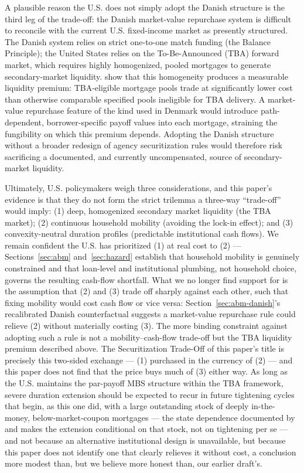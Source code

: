 \documentclass[12pt]{article}
\begin{document}
A plausible reason the U.S. does not simply adopt the Danish structure is the third leg of the trade-off: the Danish market-value repurchase system is difficult to reconcile with the current U.S. fixed-income market as presently structured. The Danish system relies on strict one-to-one match funding (the Balance Principle); the United States relies on the To-Be-Announced (TBA) forward market, which requires highly homogenized, pooled mortgages to generate secondary-market liquidity. \citet{vickery2013} show that this homogeneity produces a measurable liquidity premium: TBA-eligible mortgage pools trade at significantly lower cost than otherwise comparable specified pools ineligible for TBA delivery. A market-value repurchase feature of the kind used in Denmark would introduce path-dependent, borrower-specific payoff values into each mortgage, straining the fungibility on which this premium depends. Adopting the Danish structure without a broader redesign of agency securitization rules would therefore risk sacrificing a documented, and currently uncompensated, source of secondary-market liquidity.

Ultimately, U.S. policymakers weigh three considerations, and this paper's evidence is that they do not form the strict trilemma a three-way ``trade-off'' would imply: (1) deep, homogenized secondary market liquidity (the TBA market); (2) continuous household mobility (avoiding the lock-in effect); and (3) convexity-neutral duration profiles (predictable institutional cash flows). We remain confident the U.S. has prioritized (1) at real cost to (2) --- Sections~\ref{sec:abm} and~\ref{sec:hazard} establish that household mobility is genuinely constrained and that loan-level and institutional plumbing, not household choice, governs the resulting cash-flow shortfall. What we no longer find support for is the assumption that (2) and (3) trade off sharply against each other, such that fixing mobility would cost cash flow or vice versa: Section~\ref{sec:abm-danish}'s recalibrated Danish counterfactual suggests a market-value repurchase rule could relieve (2) without materially costing (3). The more binding constraint against adopting such a rule is not a mobility--cash-flow trade-off but the TBA liquidity premium described above. The Securitization Trade-Off of this paper's title is precisely this two-sided exchange --- (1) purchased in the currency of (2) --- and this paper does not find that the price buys much of (3) either way. As long as the U.S. maintains the par-payoff MBS structure within the TBA framework, severe duration extension should be expected to recur in future tightening cycles that begin, as this one did, with a large outstanding stock of deeply in-the-money, below-market-coupon mortgages --- the state dependence documented by \citet{berger2021} and \citet{eichenbaum2022} makes the extension conditional on that stock, not on tightening per se --- and not because an alternative institutional design is unavailable, but because this paper does not identify one that clearly relieves it without cost, a conclusion more modest than, but we believe more honest than, our earlier draft's.
\end{document}
